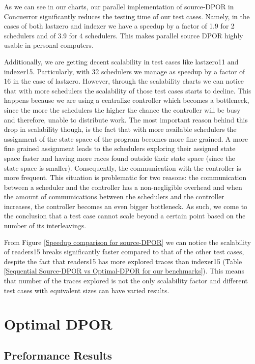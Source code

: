As we can see in our charts, our parallel implementation of source-DPOR in Concuerror significantly reduces the testing
time of our test cases. Namely, in the cases of both lastzero and indexer we have a speedup by a factor of 1.9 for 2 schedulers and
of 3.9 for 4 schedulers. This makes parallel source DPOR highly usable in personal computers.

Additionally, we are getting decent scalability in test cases like lastzero11 and indexer15. Particularly, with
32 schedulers we manage as speedup by a factor of 16 in the case of lastzero. However, through the scalability charts 
we can notice that with more schedulers the scalability of those test cases starts to decline. This happens because we
are using a centralize controller which becomes a bottleneck, since the more the schedulers the
higher the chance the controller will be busy and therefore, unable to distribute work. The most important reason 
behind this drop in scalability though, is the fact that with more available schedulers the assignment of the state
space of the program becomes more fine grained. A more fine grained assignment leads to the schedulers exploring their
assigned state space faster and having more races found outside their state space (since the state space is smaller).
Consequently, the communication with the controller is more frequent. This situation is problematic for two reasons:
the communication between a scheduler and the controller has a non-negligible overhead and when the amount of 
communications between the schedulers and the controller increases, the controller becomes an even bigger bottleneck.
As such, we come to the conclusion that a test case cannot scale beyond a certain point based on the number of its interleavings.

From Figure \ref{Speedup comparison for source-DPOR} we can notice the scalability of readers15 breaks significantly faster
compared to that of the other test cases, despite the fact that readers15 has more explored traces than indexer15
(Table \ref{Sequential Source-DPOR vs Optimal-DPOR for our benchmarks}). This means that number of the traces explored
is not the only scalability factor and different test cases with equivalent sizes can have varied results.

\section{Optimal DPOR}

\subsection{Preformance Results}


